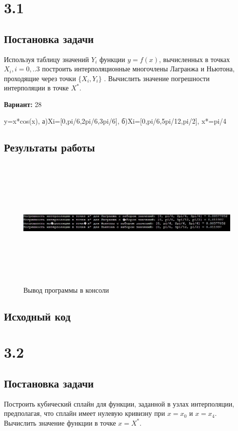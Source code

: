 \section* {3.1}

\subsection{Постановка задачи}
Используя таблицу значений $Y_i$  функции $y=f(x)$, вычисленных в точках   $X_i, i=0,..3$  построить интерполяционные многочлены Лагранжа и Ньютона, проходящие через точки $\{X_i,Y_i \}$ .  Вычислить значение погрешности интерполяции в точке $X^*$. 

{\bfseries Вариант:} 28

y=x*cos(x), а)Xi=[0,pi/6,2pi/6,3pi/6], б)Xi=[0,pi/6,5pi/12,pi/2], x*=pi/4

\subsection{Результаты работы}
\begin{figure}[h!]
\centering
\includegraphics[width=12cm, height=6.5cm]{img/img1}
\caption{Вывод программы в консоли}
\end{figure}
\pagebreak

\subsection{Исходный код}


\pagebreak

\section* {3.2}

\subsection{Постановка задачи}
Построить кубический сплайн для функции, заданной в узлах интерполяции, предполагая, что сплайн имеет нулевую кривизну при $x=x_0$  и $x=x_4$. Вычислить значение функции в точке $x=X^*$. 

